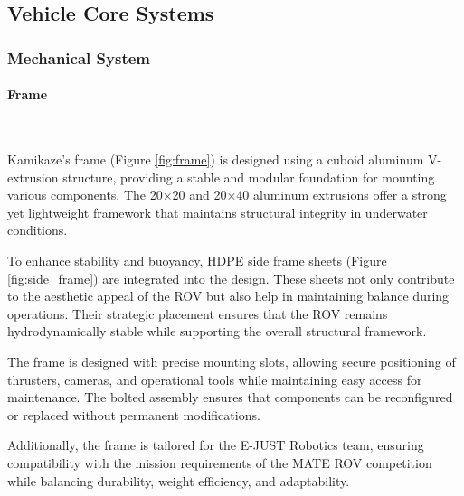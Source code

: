 \subsection{Vehicle Core Systems}
\subsubsection{Mechanical System}

\paragraph{Frame} \ \\
\vspace{-0.5cm}

Kamikaze’s frame (Figure \ref{fig:frame}) is designed using a cuboid aluminum V-extrusion structure, providing a stable and modular foundation for mounting various components. The 20×20 and 20×40 aluminum extrusions offer a strong yet lightweight framework that maintains structural integrity in underwater conditions.

\hspace{10pt} To enhance stability and buoyancy, HDPE side frame sheets (Figure \ref{fig:side_frame}) are integrated into the design. These sheets not only contribute to the aesthetic appeal of the ROV but also help in maintaining balance during operations. Their strategic placement ensures that the ROV remains hydrodynamically stable while supporting the overall structural framework.

\hspace{10pt} The frame is designed with precise mounting slots, allowing secure positioning of thrusters, cameras, and operational tools while maintaining easy access for maintenance. The bolted assembly ensures that components can be reconfigured or replaced without permanent modifications.

\hspace{10pt} Additionally, the frame is tailored for the E-JUST Robotics team, ensuring compatibility with the mission requirements of the MATE ROV competition while balancing durability, weight efficiency, and adaptability.

